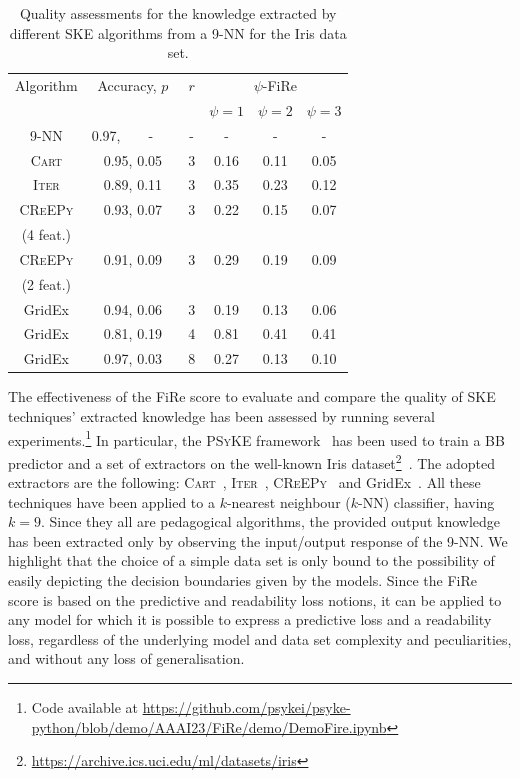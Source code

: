 \documentclass{article}
\newcommand{\psyke}{\textsc{PSyKE}}
\newcommand{\iter}{\textsc{Iter}}
\newcommand{\gridex}{GridEx}
\newcommand{\creepy}{\textsc{CReEPy}}
\newcommand{\cart}{\textsc{Cart}}
\newcommand{\fire}{FiRe}
\newcommand{\psifire}{$\psi$-\fire}
\begin{document}
\begin{table}[t]\centering
	\begin{tabular}{|c|c|c|c|c|c|}
		\toprule
		Algorithm & Accuracy, $p$ & $r$ & \multicolumn{3}{c|}{\psifire{}} \\
		& & & $\psi=1$ & $\psi=2$ & $\psi=3$ \\
		\midrule\midrule
		9-NN & 0.97,~~~~-~~~ & - & - & - & - \\
		\cart{} & 0.95, 0.05 & 3 & 0.16 & 0.11 & 0.05 \\
		\iter{} & 0.89, 0.11 & 3 & 0.35 & 0.23 & 0.12 \\
		\creepy{} & 0.93, 0.07 & 3 & 0.22 & 0.15 & 0.07 \\
		(4 feat.) & & & & & \\
		\creepy{} & 0.91, 0.09 & 3 & 0.29 & 0.19 & 0.09 \\
		(2 feat.) & & & & & \\
		\gridex{} & 0.94, 0.06 & 3 & 0.19 & 0.13 & 0.06 \\
		\gridex{} & 0.81, 0.19 & 4 & 0.81 & 0.41 & 0.41 \\
		\gridex{} & 0.97, 0.03 & 8 & 0.27 & 0.13 & 0.10 \\
		\bottomrule
	\end{tabular}
	\caption{Quality assessments for the knowledge extracted by different SKE algorithms from a 9-NN for the Iris data set.}
	\label{tab:experiments}
\end{table}

The effectiveness of the \fire{} score to evaluate and compare the quality of SKE techniques' extracted knowledge has been assessed by running several experiments.\footnote{Code available at \url{https://github.com/psykei/psyke-python/blob/demo/AAAI23/FiRe/demo/DemoFire.ipynb}}
%
In particular, the \psyke{} framework~\cite{psyke-woa2021} has been used to train a BB predictor and a set of extractors on the well-known Iris dataset\footnote{\url{https://archive.ics.uci.edu/ml/datasets/iris}}~\cite{iris}.%
%
The adopted extractors are the following: \cart{}~\cite{breiman1984classification}, \iter{}~\cite{huysmans2006iter}, \creepy{}~\cite{psyke-woa2021} and \gridex{}~\cite{gridex-extraamas2021}.
%
All these techniques have been applied to a $k$-nearest neighbour ($k$-NN) classifier, having $k=9$.
%
Since they all are pedagogical algorithms, the provided output knowledge has been extracted only by observing the input/output response of the 9-NN.
%
We highlight that the choice of a simple data set is only bound to the possibility of easily depicting the decision boundaries given by the models.
%
Since the \fire{} score is based on the predictive and readability loss notions, it can be applied to any model for which it is possible to express a predictive loss and a readability loss, regardless of the underlying model and data set complexity and peculiarities, and without any loss of generalisation.
\end{document}
